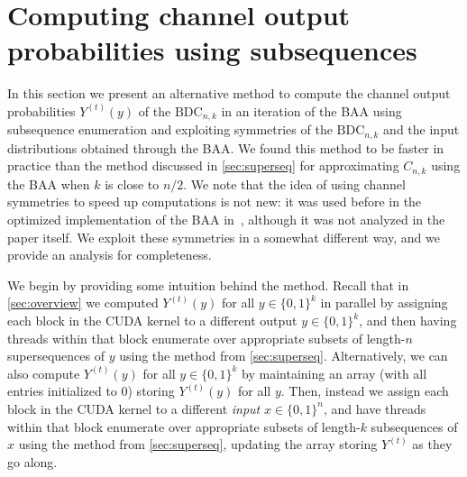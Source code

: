 \documentclass[11pt]{article}
\newcommand{\bits}{\{0,1\}}
\newcommand{\BDC}{\mathrm{BDC}}
\begin{document}
\newpage






















\appendix






\section{Computing channel output probabilities using subsequences}\label{app:output-seqs}

In this section we present an alternative method to compute the channel output probabilities $Y^{(t)}(y)$ of the $\BDC_{n,k}$ in an iteration of the BAA using subsequence enumeration and exploiting symmetries of the $\BDC_{n,k}$ and the input distributions obtained through the BAA.
We found this method to be faster in practice than the method discussed in \cref{sec:superseq} for approximating $C_{n,k}$ using the BAA when $k$ is close to $n/2$.
We note that the idea of using channel symmetries to speed up computations is not new:
it was used before in the optimized implementation of the BAA in~\cite{RC23}, although it was not analyzed in the paper itself.
We exploit these symmetries in a somewhat different way, and we provide an analysis for completeness.

We begin by providing some intuition behind the method.
Recall that in \cref{sec:overview} we computed $Y^{(t)}(y)$ for all $y\in\bits^k$ in parallel by assigning each block in the CUDA kernel to a different output $y\in\bits^k$, and then having threads within that block enumerate over appropriate subsets of length-$n$ supersequences of $y$ using the method from \cref{sec:superseq}.
Alternatively, we can also compute $Y^{(t)}(y)$ for all $y\in\bits^k$ by maintaining an array (with all entries initialized to $0$) storing $Y^{(t)}(y)$ for all $y$.  
Then,
instead we assign each block in the CUDA kernel to a different \emph{input} $x\in\bits^n$, and have threads within that block enumerate over appropriate subsets of length-$k$ subsequences of $x$ using the method from \cref{sec:superseq}, updating the array storing $Y^{(t)}$ as they go along.
\end{document}

